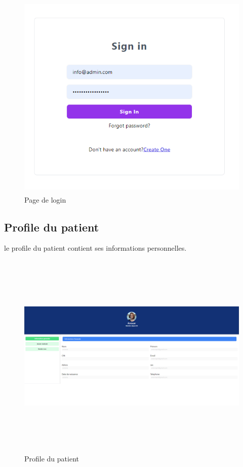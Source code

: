 \begin{figure}[!h]
\begin{center}
\includegraphics[height=10cm]{log.png}
\end{center}
\caption{Page de login }
\end{figure}


\subsection{Profile du patient}

le profile du patient contient ses informations personnelles.

\begin{figure}[!h]
\centering
\begin{center}
\includegraphics[height=10cm,width=18cm]{gen.png}
\end{center}
\caption{Profile du patient}
\end{figure}


